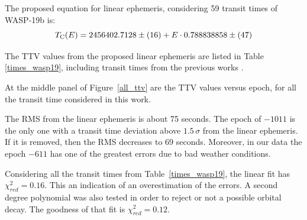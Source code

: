 The proposed equation for linear ephemeris, considering 59 transit times of WASP-19b is:
\begin{equation} \label{eq1_w19}
T_{\rm C}(E)=2456402.7128\pm(16)+E \cdot 0.788838858\pm(47)
\end{equation}

The TTV values from the proposed linear ephemeris are listed in Table \ref{times_wasp19}, including transit times from the previous works \citep{Hebb2010,Anderson2010,Lendl2013,Tregloan2013,Bean2013,Mancini2013}. 

At the middle panel of Figure~\ref{all_ttv} are the TTV values versus epoch, for all the transit time considered in this work.

The RMS from the linear ephemeris is about 75 seconds. The epoch of $-1011$ is the only one with a transit time deviation above $1.5\,\sigma$ from the linear ephemeris. If it is removed, then the RMS decreases to 69 seconds. Moreover, in our data the epoch $-611$ has one of the greatest errors due to bad weather conditions.

Considering all the transit times from Table~\ref{times_wasp19}, the linear fit has $\chi^{2}_{red} = 0.16$. This an indication of an overestimation of the errors. A second degree polynomial was also tested in order to reject or not a possible orbital decay. The goodness of that fit is $\chi^{2}_{red}=0.12$. 

